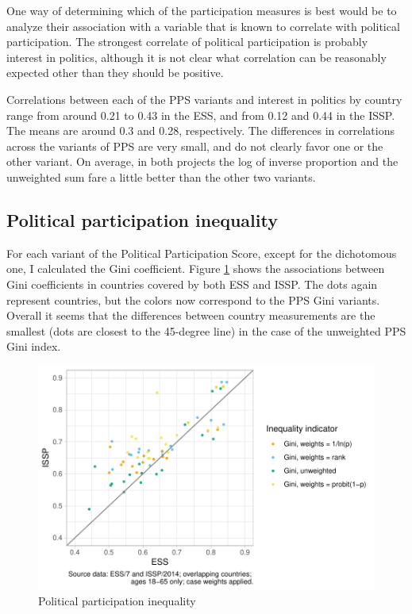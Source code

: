 \documentclass[12pt,]{article}
\begin{document}
One way of determining which of the participation measures is best would be to analyze their association with a variable that is known to correlate with political participation. The strongest correlate of political participation is probably interest in politics, although it is not clear what correlation can be reasonably expected other than they should be positive.

Correlations between each of the PPS variants and interest in politics by country range from around 0.21 to 0.43 in the ESS, and from 0.12 and 0.44 in the ISSP. The means are around 0.3 and 0.28, respectively. The differences in correlations across the variants of PPS are very small, and do not clearly favor one or the other variant. On average, in both projects the log of inverse proportion and the unweighted sum fare a little better than the other two variants.

\hypertarget{political-participation-inequality}{%
\subsection{Political participation inequality}\label{political-participation-inequality}}

For each variant of the Political Participation Score, except for the dichotomous one, I calculated the Gini coefficient. Figure \ref{fig:part-gini-dot-plot} shows the associations between Gini coefficients in countries covered by both ESS and ISSP. The dots again represent countries, but the colors now correspond to the PPS Gini variants. Overall it seems that the differences between country measurements are the smallest (dots are closest to the 45-degree line) in the case of the unweighted PPS Gini index.

\begin{figure}[H]

{\centering \includegraphics{report_files/figure-latex/part-gini-dot-plot-1} 

}

\caption{Political participation inequality}\label{fig:part-gini-dot-plot}
\end{figure}
\end{document}
